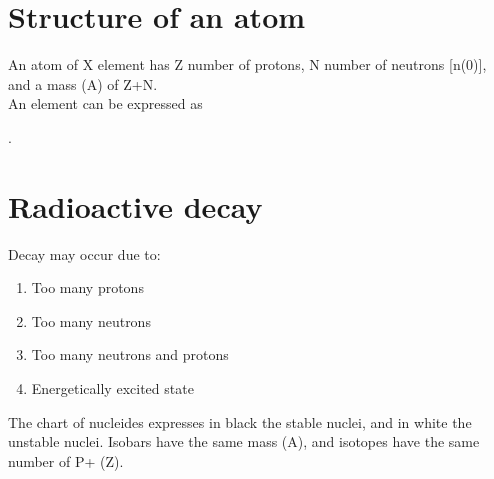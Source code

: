 \section{Structure of an atom}
An atom of X element has Z number of protons, N number of neutrons [n(0)], and a mass (A) of Z+N. \\
An element can be expressed as  \par.
\section{Radioactive decay}
Decay may occur due to:
 \begin{enumerate}
	\item Too many protons
	\item Too many neutrons
	\item Too many neutrons and protons
	\item Energetically excited state
\end{enumerate}
The chart of nucleides expresses in black the stable nuclei, and in white the unstable nuclei. Isobars have the same mass (A), and isotopes have the same number of P+ (Z).
